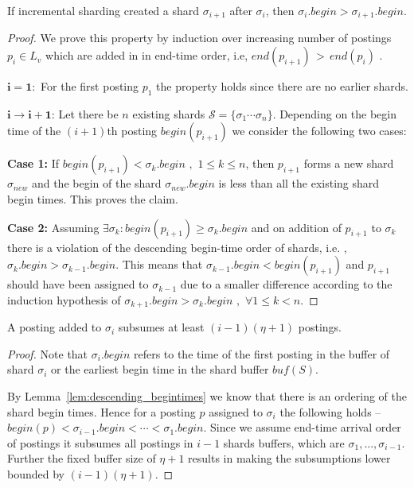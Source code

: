 \begin{lemma}
\label{lem:descending_begintimes}
If incremental sharding created a shard $\sigma_{i+1}$ after $\sigma_i$, then $\sigma_i.begin > \sigma_{i+1}.begin$.
\end{lemma}
\begin{proof}{}
	We prove this property by induction over increasing number of postings $p_i \in L_v$ which are added in in end-time order, i.e, $end(p_{i+1}) \, > \, end(p_{i})$ .

	$\mathbf{i = 1:}$ For the first posting $p_1$ the property holds since there are no earlier shards.

	$\mathbf{i \rightarrow i+1}$: Let there be $n$ existing shards $\mathcal{S} = \{ \sigma_1 \cdots \sigma_n \}$. Depending on the begin time of the $(i+1)$th posting $begin(p_{i+1})$ we consider the following two cases:

	\textbf{Case 1:} If $begin(p_{i+1}) < \sigma_k.begin \,\, , \,\, 1 \le k \le n$, then $p_{i+1}$ forms a new shard $\sigma_{new}$ and the begin of the shard $\sigma_{new}.begin$ is less than all the existing shard begin times. This proves the claim.

	\textbf{Case 2:} Assuming $\exists \sigma_k : begin(p_{i+1}) \geq \sigma_k.begin$ and on addition of $p_{i+1}$ to $\sigma_k$ there is a violation of the descending begin-time order of shards, i.e. , $\sigma_k.begin > \sigma_{k-1}.begin$. This means that $\sigma_{k-1}.begin < begin(p_{i+1})$ and $p_{i+1}$ should have been assigned to $\sigma_{k-1}$ due to a smaller difference according to the induction hypothesis of $\sigma_{k+1}.begin > \sigma_{k}.begin\,\,, \,\,\forall 1 \le k < n$.
\end{proof}

\begin{lemma}
\label{lem:incremental_subsumption}
	A posting added to $\sigma_i$ subsumes at least $(i-1)(\eta + 1)$ postings.
\end{lemma}


\begin{proof}{}
	Note that $\sigma_i.begin$ refers to the time of the first posting in the buffer of shard $\sigma_i$ or the earliest begin time in the shard buffer $bu\!f(S)$. 
	
	By Lemma~\ref{lem:descending_begintimes} we know that there is an ordering of the shard begin times. Hence for a posting $p$ assigned to $\sigma_i$ the following holds -- $begin(p) < \sigma_{i-1}.begin < \cdots < \sigma_1.begin$. Since we assume end-time arrival order of postings it subsumes all postings in $i-1$ shards buffers, which are $\sigma_1,...,\sigma_{i-1}$. Further the fixed buffer size of $\eta+1$ results in making the subsumptions lower bounded by $(i-1)(\eta + 1)$.\end{proof}

